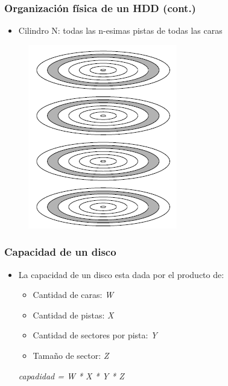 \begin{frame}
  \frametitle{Organización física de un \textbf{HDD} (cont.)}
  \begin{itemize}
    \item Cilindro N: todas las n-esimas pistas de todas las caras
  \end{itemize}
  \begin{figure}
    \includegraphics[scale=0.4]{images/cylinders.png}
  \end{figure}
\end{frame}

\begin{frame}
  \frametitle{Capacidad de un disco}
  \begin{itemize}
    \item La capacidad de un disco esta dada por el producto de:
    \begin{itemize}
      \item Cantidad de caras: \emph{W}
      \item Cantidad de pistas: \emph{X}
      \item Cantidad de sectores por pista: \emph{Y}
      \item Tamaño de sector: \emph{Z}
    \end{itemize}

    \emph{capadidad = W * X * Y * Z}
  \end{itemize}
\end{frame}

